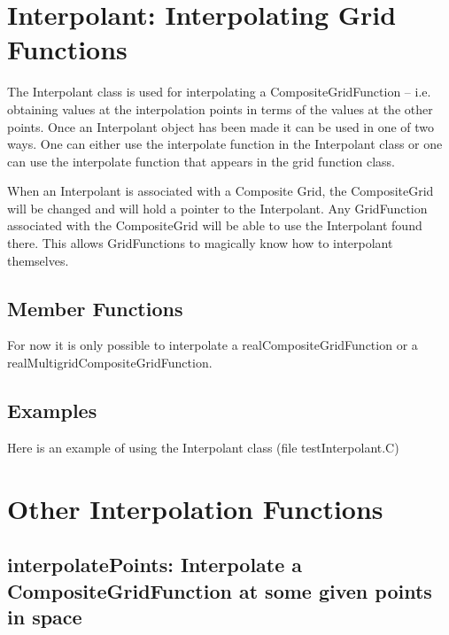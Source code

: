 \section{Interpolant: Interpolating Grid Functions} \label{Interpolant}


The Interpolant class is used for interpolating a CompositeGridFunction --
i.e. obtaining values at the interpolation points in terms of the
values at the other points. Once an Interpolant object has been made
it can be used in one of two ways. One can either use the {\ff interpolate}
function in the Interpolant class or one can use the {\ff interpolate}
function that appears in the grid function class.

When an Interpolant is associated with a Composite Grid, the CompositeGrid will
be changed and will hold a pointer to the Interpolant. Any GridFunction associated
with the CompositeGrid will be able to use the Interpolant found there. This
allows GridFunctions to magically know how to interpolant themselves.


\subsection{Member Functions}

For now it is only possible to interpolate a {\ff real\-Composite\-Grid\-Function}
or a {\ff real\-Multigrid\-Composite\-Grid\-Function}. 

   

\subsection{Examples}

Here is an example of using the Interpolant class 
(file {\ff \examples testInterpolant.C})
{\footnotesize
{}
}


\section{Other Interpolation Functions}


\subsection{interpolatePoints: Interpolate a CompositeGridFunction at some given points in space}

